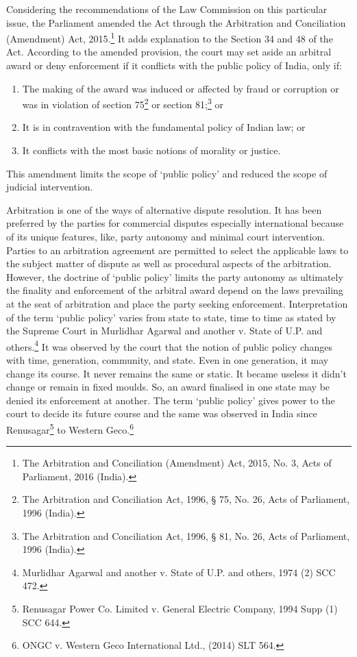 \begin{multicols}{2}
\noi
Considering the recommendations of the Law Commission on this particular issue, the
Parliament amended the Act through the Arbitration and Conciliation (Amendment) Act,
2015.\footnote{The Arbitration and Conciliation (Amendment) Act, 2015, No. 3, Acts of Parliament, 2016 (India).} It adds explanation to the Section 34 and 48 of the Act. According to the amended
provision, the court may set aside an arbitral award or deny enforcement if it conflicts with
the public policy of India, only if:

\begin{enumerate}
\item The making of the award was induced or affected by fraud or corruption or was in violation of section 75\footnote{The Arbitration and Conciliation Act, 1996, § 75, No. 26, Acts of Parliament, 1996 (India).} or section 81;\footnote{The Arbitration and Conciliation Act, 1996, § 81, No. 26, Acts of Parliament, 1996 (India).} or

\item It is in contravention with the fundamental policy of Indian law; or

\item It conflicts with the most basic notions of morality or justice.
\end{enumerate}

\noi
This amendment limits the scope of ‘public policy’ and reduced the scope of judicial
intervention.


\noi
Arbitration is one of the ways of alternative dispute resolution. It has been preferred by the
parties for commercial disputes especially international because of its unique features, like,
party autonomy and minimal court intervention. Parties to an arbitration agreement are
permitted to select the applicable laws to the subject matter of dispute as well as procedural
aspects of the arbitration. However, the doctrine of ‘public policy’ limits the party autonomy
as ultimately the finality and enforcement of the arbitral award depend on the laws prevailing
at the seat of arbitration and place the party seeking enforcement. Interpretation of the term
‘public policy’ varies from state to state, time to time as stated by the Supreme Court in
Murlidhar Agarwal and another v. State of U.P. and others.\footnote{Murlidhar Agarwal and another v. State of U.P. and others, 1974 (2) SCC 472.} It was observed by the court that the notion of public policy changes with time, generation, community, and state. Even in one
generation, it may change its course. It never remains the same or static. It became useless it
didn’t change or remain in fixed moulds. So, an award finalised in one state may be denied its
enforcement at another. The term ‘public policy’ gives power to the court to decide its future
course and the same was observed in India since Renusagar\footnote{Renusagar Power Co. Limited v. General Electric Company, 1994 Supp (1) SCC 644.} to Western Geco.\footnote{ONGC v. Western Geco International Ltd., (2014) SLT 564.}


\end{multicols}

